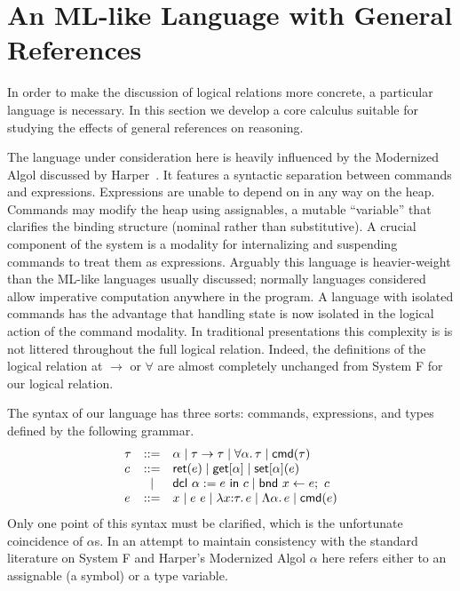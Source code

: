 \section{An ML-like Language with General References}\label{sec:language}

In order to make the discussion of logical relations more concrete, a
particular language is necessary. In this section we develop a core
calculus suitable for studying the effects of general references on
reasoning.

The language under consideration here is heavily influenced by the
Modernized Algol discussed by Harper~\citep{Harper:16}. It features a
syntactic separation between commands and expressions. Expressions are
unable to depend on in any way on the heap. Commands may modify the
heap using assignables, a mutable ``variable'' that clarifies the
binding structure (nominal rather than substitutive). A crucial
component of the system is a modality for internalizing and suspending
commands to treat them as expressions. Arguably this language is
heavier-weight than the ML-like languages usually discussed; normally
languages considered allow imperative computation anywhere in the
program. A language with isolated commands has the advantage that
handling state is now isolated in the logical action of the command
modality. In traditional presentations this complexity is is not
littered throughout the full logical relation. Indeed, the definitions
of the logical relation at $\to$ or $\forall$ are almost completely
unchanged from System F for our logical relation.

The syntax of our language has three sorts: commands, expressions, and
types defined by the following grammar.
\[
  \begin{array}{lcl}
    \tau & ::= & \alpha \mid \tau \to \tau \mid \forall \alpha.\, \tau
    \mid \mathsf{cmd}(\tau)\\
    c & ::= & \mathsf{ret}(e) \mid \mathsf{get}[\alpha] \mid \mathsf{set}[\alpha](e) \\
      & \mid & \mathsf{dcl}\ \alpha := e\ \mathsf{in}\ c \mid \mathsf{bnd}\ x \gets e;\ c\\
    e & ::= & x \mid e\ e \mid \lambda x {:} \tau.\, e \mid
              \Lambda \alpha.\, e \mid \mathsf{cmd}(e)
  \end{array}
\]
Only one point of this syntax must be clarified, which is the
unfortunate coincidence of $\alpha$s. In an attempt to maintain
consistency with the standard literature on System F and Harper's
Modernized Algol $\alpha$ here refers either to an assignable (a
symbol) or a type variable.


